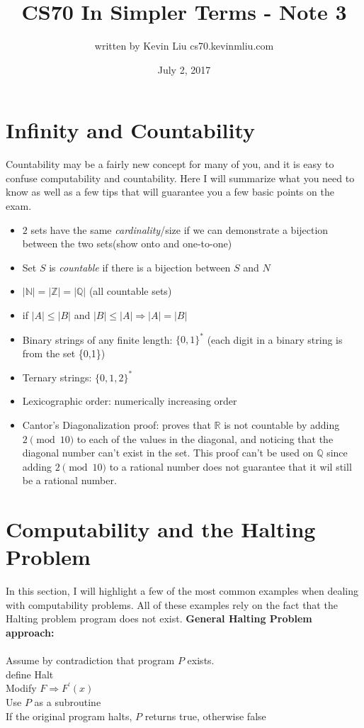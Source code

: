 \documentclass[a4paper]{article}
\title{CS70 In Simpler Terms - Note 3}
\author{written by Kevin Liu cs70.kevinmliu.com}
\date{July 2, 2017}
\newcommand{\R}{\mathbb{R}}
\newcommand{\Z}{\mathbb{Z}}
\newcommand{\N}{\mathbb{N}}
\newcommand{\Q}{\mathbb{Q}}
\begin{document}
\maketitle

\section{Infinity and Countability}
Countability may be a fairly new concept for many of you, and it is easy to confuse computability and countability. Here I will summarize what you need to know as well as a few tips that will guarantee you a few basic points on the exam. 
\begin{itemize}
    \item $2$ sets have the same \textit{cardinality}/size if we can demonstrate a bijection between the two sets(show onto and one-to-one)
    \item Set $S$ is \textit{countable} if there is a bijection between $S$ and $N$
    \item $|\N| = |\Z| = |\Q|$ (all countable sets)
    \item if $|A| \leq |B|$ and $|B| \leq |A| \Rightarrow |A| = |B|$
    \item Binary strings of any finite length: $\{0,1\}^*$ (each digit in a binary string is from the set \{0,1\})
    \item Ternary strings: $\{0,1,2\}^*$ 
    \item Lexicographic order: numerically increasing order
    \item Cantor's Diagonalization proof: proves that $\R$ is not countable by adding $2\pmod{10}$ to each of the values in the diagonal, and noticing that the diagonal number can't exist in the set. This proof can't be used on $\Q$ since adding $2\pmod{10}$ to a rational number does not guarantee that it wil still be a rational number.    

\end{itemize}

\section{Computability and the Halting Problem}
In this section, I will highlight a few of the most common examples when dealing with computability problems. All of these examples rely on the fact that the Halting problem program does not exist. 
\textbf{General Halting Problem approach:} \\\\
Assume by contradiction that program $P$ exists.\\
\indent define Halt \\
\indent Modify $F \Rightarrow F^{'}(x)$\\
\indent Use $P$ as a subroutine\\
\indent If the original program halts, $P$ returns true, otherwise false\\
\end{document}

